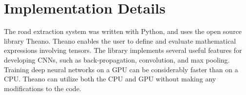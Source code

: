 \section{Implementation Details}
\label{sec:methods_implementation_details}
The road extraction system was written with Python, and uses the open source library Theano. Theano enables the user to define and evaluate mathematical expressions involving tensors. The library implements several useful features for developing \ac{CNN}s, such as back-propagation, convolution, and max pooling. Training deep neural networks on a \ac{GPU} can be considerably faster than on a \ac{CPU}. Theano can utilize both the \ac{CPU} and \ac{GPU} without making any modifications to the code.\\

